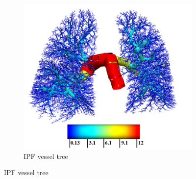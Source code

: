 \begin{figure}[htbp] 
\centering
\begin{subfigure}{.55\linewidth}%
  \includegraphics[width=\linewidth,trim={{.0\wd0} {.0\wd0} {.0\wd0} {.0\wd0}},clip]{ModelBasedAnalysis/Image/IPF405_ArteryRadius_IPF.png}
  \caption{IPF vessel tree}
  \label{fig:VesselTreeGeometry-a} 
\end{subfigure}

\end{figure}
